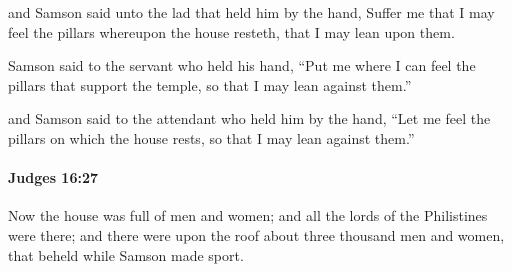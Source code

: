 			\begin{versebox}
					\item[BHS] 
					\item[ASV] and Samson said unto the lad that held him by the hand, Suffer me that I may feel the pillars whereupon the house resteth, that I may lean upon them.
					\item[NIV] Samson said to the servant who held his hand, “Put me where I can feel the pillars that support the temple, so that I may lean against them.”
					\item[NRSV] and Samson said to the attendant who held him by the hand, “Let me feel the pillars on which the house rests, so that I may lean against them.”
			\end{versebox}

		\paragraph{Judges 16:27} %
			\label{JUDGES-16-27}

			Now the house was full of men and women; and all the lords of the Philistines were there; and there were upon the roof about three thousand men and women, that beheld while Samson made sport.

